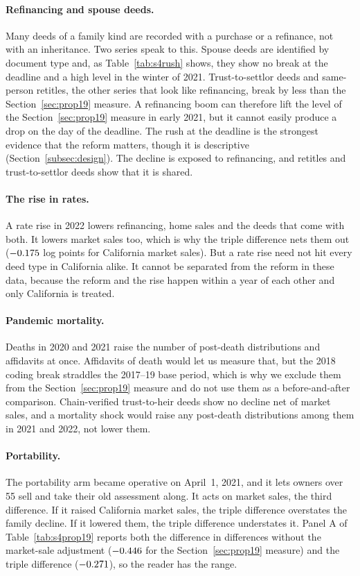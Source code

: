 \paragraph{Refinancing and spouse deeds.} Many deeds of a family kind are recorded with a purchase or a refinance, not with an inheritance. Two series speak to this. Spouse deeds are identified by document type and, as Table~\ref{tab:s4rush} shows, they show no break at the deadline and a high level in the winter of 2021. Trust-to-settlor deeds and same-person retitles, the other series that look like refinancing, break by less than the Section~\ref{sec:prop19} measure. A refinancing boom can therefore lift the level of the Section~\ref{sec:prop19} measure in early 2021, but it cannot easily produce a drop on the day of the deadline. The rush at the deadline is the strongest evidence that the reform matters, though it is descriptive (Section~\ref{subsec:design}). The decline is exposed to refinancing, and retitles and trust-to-settlor deeds show that it is shared.

\paragraph{The rise in rates.} A rate rise in 2022 lowers refinancing, home sales and the deeds that come with both. It lowers market sales too, which is why the triple difference nets them out ($-0.175$ log points for California market sales). But a rate rise need not hit every deed type in California alike. It cannot be separated from the reform in these data, because the reform and the rise happen within a year of each other and only California is treated.

\paragraph{Pandemic mortality.} Deaths in 2020 and 2021 raise the number of post-death distributions and affidavits at once. Affidavits of death would let us measure that, but the 2018 coding break straddles the 2017--19 base period, which is why we exclude them from the Section~\ref{sec:prop19} measure and do not use them as a before-and-after comparison. Chain-verified trust-to-heir deeds show no decline net of market sales, and a mortality shock would raise any post-death distributions among them in 2021 and 2022, not lower them.

\paragraph{Portability.} The portability arm became operative on April~1, 2021, and it lets owners over 55 sell and take their old assessment along. It acts on market sales, the third difference. If it raised California market sales, the triple difference overstates the family decline. If it lowered them, the triple difference understates it. Panel A of Table~\ref{tab:s4prop19} reports both the difference in differences without the market-sale adjustment ($-0.446$ for the Section~\ref{sec:prop19} measure) and the triple difference ($-0.271$), so the reader has the range.

